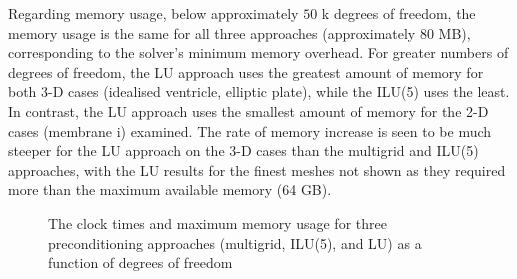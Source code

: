 \documentclass[sn-mathphys,Numbered]{sn-jnl}%
\begin{document}
Regarding memory usage, below approximately $50$ k degrees of freedom, the memory usage is the same for all three approaches (approximately $80$ MB), corresponding to the solver's minimum memory overhead.
For greater numbers of degrees of freedom, the LU approach uses the greatest amount of memory for both 3-D cases (idealised ventricle, elliptic plate), while the ILU(5) uses the least.
In contrast, the LU approach uses the smallest amount of memory for the 2-D cases (membrane i) examined.
The rate of memory increase is seen to be much steeper for the LU approach on the 3-D cases than the multigrid and ILU(5) approaches, with the LU results for the finest meshes not shown as they required more than the maximum available memory (64 GB).
\begin{figure}[htbp]
   \centering
   \caption{The clock times and maximum memory usage for three preconditioning approaches (multigrid, ILU(5), and LU) as a function of degrees of freedom}
   \label{fig:times_memory}
\end{figure}
\end{document}
